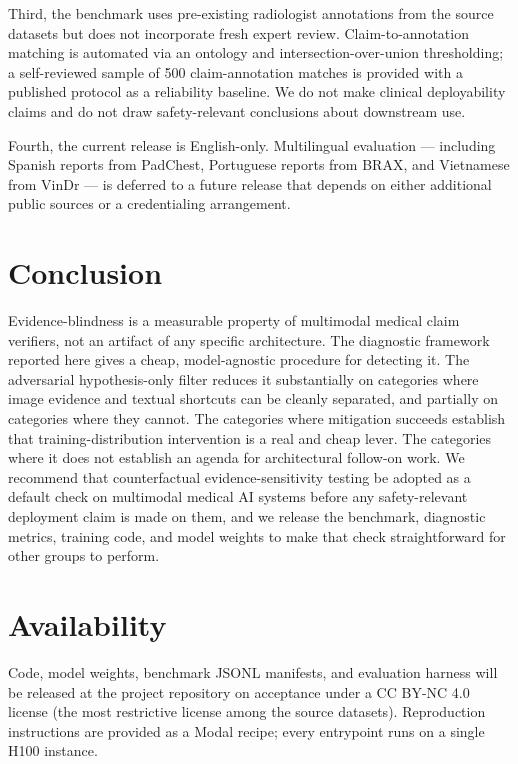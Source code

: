 \documentclass[11pt]{article}
\begin{document}
Third, the benchmark uses pre-existing radiologist annotations from the source datasets but does not incorporate fresh expert review. Claim-to-annotation matching is automated via an ontology and intersection-over-union thresholding; a self-reviewed sample of 500 claim-annotation matches is provided with a published protocol as a reliability baseline. We do not make clinical deployability claims and do not draw safety-relevant conclusions about downstream use.

Fourth, the current release is English-only. Multilingual evaluation --- including Spanish reports from PadChest, Portuguese reports from BRAX, and Vietnamese from VinDr --- is deferred to a future release that depends on either additional public sources or a credentialing arrangement.

\section{Conclusion}

Evidence-blindness is a measurable property of multimodal medical claim verifiers, not an artifact of any specific architecture. The diagnostic framework reported here gives a cheap, model-agnostic procedure for detecting it. The adversarial hypothesis-only filter reduces it substantially on categories where image evidence and textual shortcuts can be cleanly separated, and partially on categories where they cannot. The categories where mitigation succeeds establish that training-distribution intervention is a real and cheap lever. The categories where it does not establish an agenda for architectural follow-on work. We recommend that counterfactual evidence-sensitivity testing be adopted as a default check on multimodal medical AI systems before any safety-relevant deployment claim is made on them, and we release the benchmark, diagnostic metrics, training code, and model weights to make that check straightforward for other groups to perform.

\section*{Availability}

Code, model weights, benchmark JSONL manifests, and evaluation harness will be released at the project repository on acceptance under a CC BY-NC 4.0 license (the most restrictive license among the source datasets). Reproduction instructions are provided as a Modal recipe; every entrypoint runs on a single H100 instance.
\end{document}
